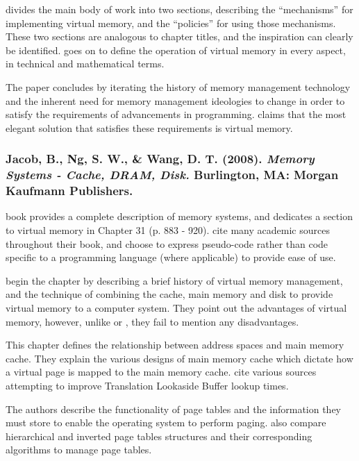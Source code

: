 \citet{Denning1970} divides the main body of work into two sections, describing the ``mechanisms'' for implementing virtual memory, and the ``policies'' for using those mechanisms. These two sections are analogous to  chapter titles, and the inspiration can clearly be identified. \citet{Denning1970} goes on to define the operation of virtual memory in every aspect, in technical and mathematical terms. 

The paper concludes by iterating the history of memory management technology and the inherent need for memory management ideologies to change in order to satisfy the requirements of advancements in programming. \citet{Denning1970} claims that the most elegant solution that satisfies these requirements is virtual memory.

\subsubsection*{Jacob, B., Ng, S. W., \& Wang, D. T. (2008). \emph{Memory Systems - Cache, DRAM, Disk.} Burlington, MA: Morgan Kaufmann Publishers.}

 book provides a complete description of memory systems, and dedicates a section to virtual memory in Chapter 31 (p. 883 - 920). \citet{Jacob2008} cite many academic sources throughout their book, and choose to express pseudo-code rather than code specific to a programming language (where applicable) to provide ease of use.

\citet{Jacob2008} begin the chapter by describing a brief history of virtual memory management, and the technique of combining the cache, main memory and disk to provide virtual memory to a computer system. They point out the advantages of virtual memory, however, unlike \citet{Blanchet2012} or \citet{Blunden2003}, they fail to mention any disadvantages.

This chapter defines the relationship between address spaces and main memory cache. They explain the various designs of main memory cache which dictate how a virtual page is mapped to the main memory cache. \citet{Jacob2008} cite various sources attempting to improve Translation Lookaside Buffer lookup times.

The authors describe the functionality of page tables and the information they must store to enable the operating system to perform paging. \citet{Jacob2008} also compare hierarchical and inverted page tables structures and their corresponding algorithms to manage page tables.

